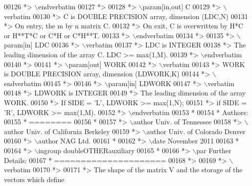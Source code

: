 \begin{DoxyCode}
00126 \textcolor{comment}{*> \(\backslash\)endverbatim}
00127 \textcolor{comment}{*>}
00128 \textcolor{comment}{*> \(\backslash\)param[in,out] C}
00129 \textcolor{comment}{*> \(\backslash\)verbatim}
00130 \textcolor{comment}{*>          C is DOUBLE PRECISION array, dimension (LDC,N)}
00131 \textcolor{comment}{*>          On entry, the m by n matrix C.}
00132 \textcolor{comment}{*>          On exit, C is overwritten by H*C or H**T*C or C*H or C*H**T.}
00133 \textcolor{comment}{*> \(\backslash\)endverbatim}
00134 \textcolor{comment}{*>}
00135 \textcolor{comment}{*> \(\backslash\)param[in] LDC}
00136 \textcolor{comment}{*> \(\backslash\)verbatim}
00137 \textcolor{comment}{*>          LDC is INTEGER}
00138 \textcolor{comment}{*>          The leading dimension of the array C. LDC >= max(1,M).}
00139 \textcolor{comment}{*> \(\backslash\)endverbatim}
00140 \textcolor{comment}{*>}
00141 \textcolor{comment}{*> \(\backslash\)param[out] WORK}
00142 \textcolor{comment}{*> \(\backslash\)verbatim}
00143 \textcolor{comment}{*>          WORK is DOUBLE PRECISION array, dimension (LDWORK,K)}
00144 \textcolor{comment}{*> \(\backslash\)endverbatim}
00145 \textcolor{comment}{*>}
00146 \textcolor{comment}{*> \(\backslash\)param[in] LDWORK}
00147 \textcolor{comment}{*> \(\backslash\)verbatim}
00148 \textcolor{comment}{*>          LDWORK is INTEGER}
00149 \textcolor{comment}{*>          The leading dimension of the array WORK.}
00150 \textcolor{comment}{*>          If SIDE = 'L', LDWORK >= max(1,N);}
00151 \textcolor{comment}{*>          if SIDE = 'R', LDWORK >= max(1,M).}
00152 \textcolor{comment}{*> \(\backslash\)endverbatim}
00153 \textcolor{comment}{*}
00154 \textcolor{comment}{*  Authors:}
00155 \textcolor{comment}{*  ========}
00156 \textcolor{comment}{*}
00157 \textcolor{comment}{*> \(\backslash\)author Univ. of Tennessee }
00158 \textcolor{comment}{*> \(\backslash\)author Univ. of California Berkeley }
00159 \textcolor{comment}{*> \(\backslash\)author Univ. of Colorado Denver }
00160 \textcolor{comment}{*> \(\backslash\)author NAG Ltd. }
00161 \textcolor{comment}{*}
00162 \textcolor{comment}{*> \(\backslash\)date November 2011}
00163 \textcolor{comment}{*}
00164 \textcolor{comment}{*> \(\backslash\)ingroup doubleOTHERauxiliary}
00165 \textcolor{comment}{*}
00166 \textcolor{comment}{*> \(\backslash\)par Further Details:}
00167 \textcolor{comment}{*  =====================}
00168 \textcolor{comment}{*>}
00169 \textcolor{comment}{*> \(\backslash\)verbatim}
00170 \textcolor{comment}{*>}
00171 \textcolor{comment}{*>  The shape of the matrix V and the storage of the vectors which define}

\end{DoxyCode}
